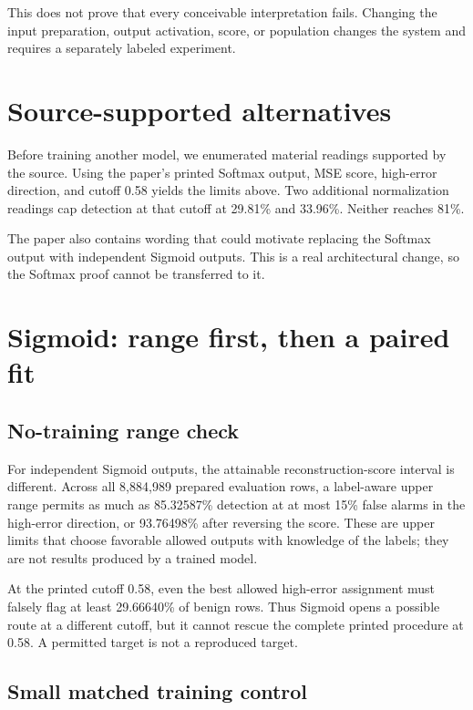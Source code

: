 \documentclass[11pt]{article}
\begin{document}
This does not prove that every conceivable interpretation fails. Changing the
input preparation, output activation, score, or population changes the system
and requires a separately labeled experiment.

\section{Source-supported alternatives}

Before training another model, we enumerated material readings supported by
the source. Using the paper's printed Softmax output, MSE score, high-error
direction, and cutoff 0.58 yields the limits above. Two additional
normalization readings cap detection at that cutoff at 29.81\% and 33.96\%.
Neither reaches 81\%.

The paper also contains wording that could motivate replacing the Softmax
output with independent Sigmoid outputs. This is a real architectural change,
so the Softmax proof cannot be transferred to it.

\section{Sigmoid: range first, then a paired fit}

\subsection{No-training range check}

For independent Sigmoid outputs, the attainable reconstruction-score interval
is different. Across all 8,884,989 prepared evaluation rows, a label-aware
upper range permits as much as 85.32587\% detection at at most 15\% false
alarms in the high-error direction, or 93.76498\% after reversing the score.
These are upper limits that choose favorable allowed outputs with knowledge of
the labels; they are not results produced by a trained model.

At the printed cutoff 0.58, even the best allowed high-error assignment must
falsely flag at least 29.66640\% of benign rows. Thus Sigmoid opens a possible
route at a different cutoff, but it cannot rescue the complete printed
procedure at 0.58. A permitted target is not a reproduced target.

\subsection{Small matched training control}
\end{document}
